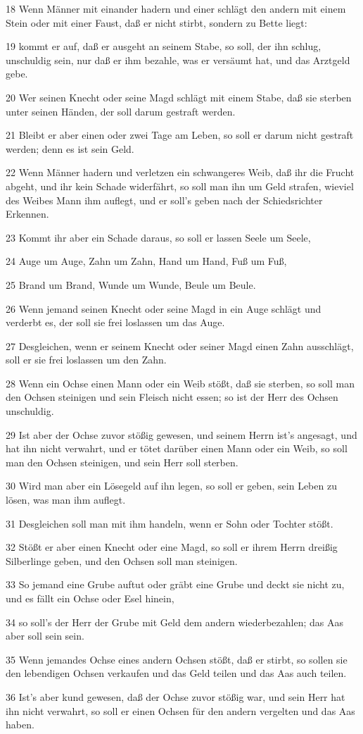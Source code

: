 \par 18 Wenn Männer mit einander hadern und einer schlägt den andern mit einem Stein oder mit einer Faust, daß er nicht stirbt, sondern zu Bette liegt:
\par 19 kommt er auf, daß er ausgeht an seinem Stabe, so soll, der ihn schlug, unschuldig sein, nur daß er ihm bezahle, was er versäumt hat, und das Arztgeld gebe.
\par 20 Wer seinen Knecht oder seine Magd schlägt mit einem Stabe, daß sie sterben unter seinen Händen, der soll darum gestraft werden.
\par 21 Bleibt er aber einen oder zwei Tage am Leben, so soll er darum nicht gestraft werden; denn es ist sein Geld.
\par 22 Wenn Männer hadern und verletzen ein schwangeres Weib, daß ihr die Frucht abgeht, und ihr kein Schade widerfährt, so soll man ihn um Geld strafen, wieviel des Weibes Mann ihm auflegt, und er soll's geben nach der Schiedsrichter Erkennen.
\par 23 Kommt ihr aber ein Schade daraus, so soll er lassen Seele um Seele,
\par 24 Auge um Auge, Zahn um Zahn, Hand um Hand, Fuß um Fuß,
\par 25 Brand um Brand, Wunde um Wunde, Beule um Beule.
\par 26 Wenn jemand seinen Knecht oder seine Magd in ein Auge schlägt und verderbt es, der soll sie frei loslassen um das Auge.
\par 27 Desgleichen, wenn er seinem Knecht oder seiner Magd einen Zahn ausschlägt, soll er sie frei loslassen um den Zahn.
\par 28 Wenn ein Ochse einen Mann oder ein Weib stößt, daß sie sterben, so soll man den Ochsen steinigen und sein Fleisch nicht essen; so ist der Herr des Ochsen unschuldig.
\par 29 Ist aber der Ochse zuvor stößig gewesen, und seinem Herrn ist's angesagt, und hat ihn nicht verwahrt, und er tötet darüber einen Mann oder ein Weib, so soll man den Ochsen steinigen, und sein Herr soll sterben.
\par 30 Wird man aber ein Lösegeld auf ihn legen, so soll er geben, sein Leben zu lösen, was man ihm auflegt.
\par 31 Desgleichen soll man mit ihm handeln, wenn er Sohn oder Tochter stößt.
\par 32 Stößt er aber einen Knecht oder eine Magd, so soll er ihrem Herrn dreißig Silberlinge geben, und den Ochsen soll man steinigen.
\par 33 So jemand eine Grube auftut oder gräbt eine Grube und deckt sie nicht zu, und es fällt ein Ochse oder Esel hinein,
\par 34 so soll's der Herr der Grube mit Geld dem andern wiederbezahlen; das Aas aber soll sein sein.
\par 35 Wenn jemandes Ochse eines andern Ochsen stößt, daß er stirbt, so sollen sie den lebendigen Ochsen verkaufen und das Geld teilen und das Aas auch teilen.
\par 36 Ist's aber kund gewesen, daß der Ochse zuvor stößig war, und sein Herr hat ihn nicht verwahrt, so soll er einen Ochsen für den andern vergelten und das Aas haben.

